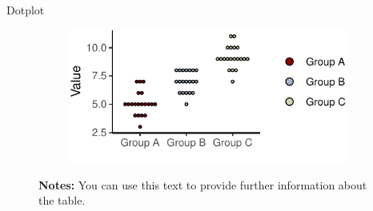 \documentclass[11pt, aspectratio=169, t]{beamer}
\begin{document}
\begin{frame}{Dotplot}
\protect\hypertarget{dotplot}{}
\begin{figure}

\caption{\label{fig-dotplot}Visualizing distributions with few
observations}

{\centering 

\begin{figure}[H]

{\centering \includegraphics{example_slides_files/figure-beamer/dotplot-1.pdf}

}

\end{figure}

\hypertarget{fig-dotplot-1}{}
\vspace{-10pt}
\begin{minipage}{0.9\textwidth}
\scriptsize
\singlespacing
\textbf{Notes:} You can use this text to provide further information about the table. \lipsum[66]
\end{minipage}
\vspace{15pt}

}

\end{figure}
\end{frame}
\end{document}
